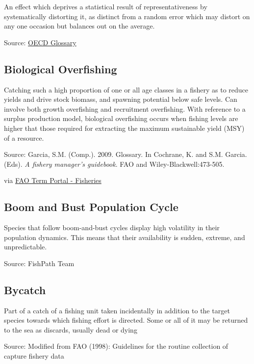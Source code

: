 \documentclass[
  11pt,
]{book}
\begin{document}
An effect which deprives a statistical result of representativeness by systematically distorting it, as distinct from a random error which may distort on any one occasion but balances out on the average.

Source: \href{https://stats.oecd.org/glossary/detail.asp?ID=3605}{OECD Glossary}

\hypertarget{biological-overfishing}{%
\subsection{Biological Overfishing}\label{biological-overfishing}}

Catching such a high proportion of one or all age classes in a fishery as to reduce yields and drive stock biomass, and spawning potential below safe levels. Can involve both growth overfishing and recruitment overfishing. With reference to a surplus production model, biological overfishing occurs when fishing levels are higher that those required for extracting the maximum sustainable yield (MSY) of a resource.

Source: Garcia, S.M. (Comp.). 2009. Glossary. In Cochrane, K. and S.M. Garcia. (Eds). \emph{A fishery manager's guidebook}. FAO and Wiley-Blackwell:473-505.

via \href{http://www.fao.org/fishery/glossary/en}{FAO Term Portal - Fisheries}

\hypertarget{boom-and-bust-population-cycle}{%
\subsection{Boom and Bust Population Cycle}\label{boom-and-bust-population-cycle}}

Species that follow boom-and-bust cycles display high volatility in their population dynamics. This means that their availability is sudden, extreme, and unpredictable.

Source: FishPath Team

\hypertarget{bycatch}{%
\subsection{Bycatch}\label{bycatch}}

Part of a catch of a fishing unit taken incidentally in addition to the target species towards which fishing effort is directed. Some or all of it may be returned to the sea as discards, usually dead or dying

Source: Modified from FAO (1998): Guidelines for the routine collection of capture fishery data
\end{document}

